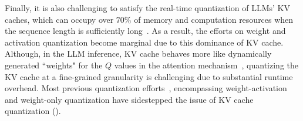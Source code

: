 


Finally, it is also challenging to satisfy the real-time quantization of LLMs' KV caches, which can occupy over $70\%$ of memory and computation resources when the sequence length is sufficiently long~\cite{hooper2024kvquant,zhao2023atom,sheng2023flexgen}. 
As a result, the efforts on weight and activation quantization become marginal due to this dominance of KV cache.
Although, in the LLM inference, KV cache behaves more like dynamically generated ``weights" for the $Q$ values in the attention mechanism~\cite{vaswani2017attention},
quantizing the KV cache at a fine-grained granularity is challenging due to substantial runtime overhead. 
Most previous quantization efforts~\cite{lin2023awq,guo2022ant,guo2023olive,frantar2023gptq,dettmers2023spqr,dettmers2023qlora}, encompassing weight-activation and weight-only quantization have sidestepped the issue of KV cache quantization ().


